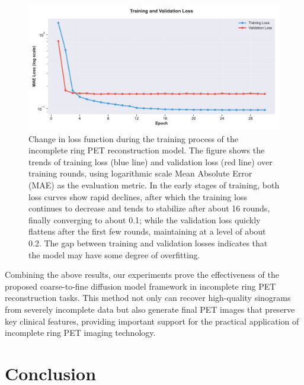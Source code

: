 \documentclass[
reprint,
superscriptaddress,
nofootinbib,
amsmath,amssymb,
aps,
prd,
]{revtex4-2}
\begin{document}
\begin{figure}[ht]
    \centering
    \includegraphics[width=\textwidth]{Images/loss_plot.pdf}
    \caption{Change in loss function during the training process of the incomplete ring PET reconstruction model. The figure shows the trends of training loss (blue line) and validation loss (red line) over training rounds, using logarithmic scale Mean Absolute Error (MAE) as the evaluation metric. In the early stages of training, both loss curves show rapid declines, after which the training loss continues to decrease and tends to stabilize after about 16 rounds, finally converging to about 0.1; while the validation loss quickly flattens after the first few rounds, maintaining at a level of about 0.2. The gap between training and validation losses indicates that the model may have some degree of overfitting.}
    \label{fig:training_validation_loss}
\end{figure}
Combining the above results, our experiments prove the effectiveness of the proposed coarse-to-fine diffusion model framework in incomplete ring PET reconstruction tasks. This method not only can recover high-quality sinograms from severely incomplete data but also generate final PET images that preserve key clinical features, providing important support for the practical application of incomplete ring PET imaging technology.


\section{Conclusion}
\label{chap:conclusion}
\end{document}
